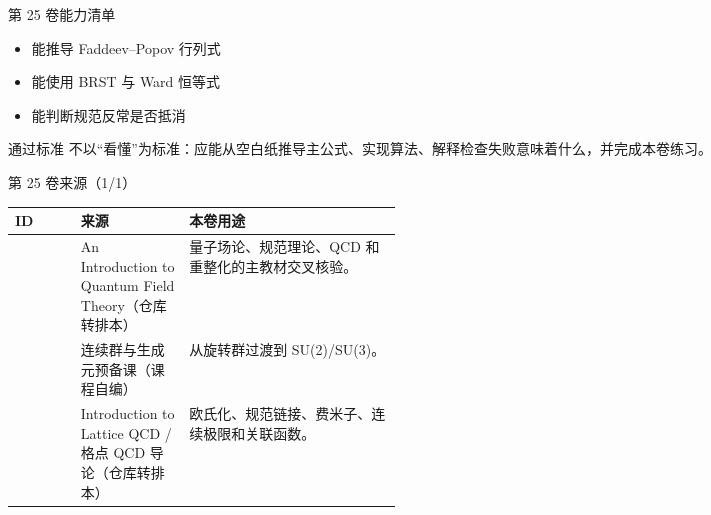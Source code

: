 \begin{frame}[t]{第 25 卷能力清单}
\small\begin{itemize}
\item[\CheckMark] 能推导 Faddeev--Popov 行列式
\item[\CheckMark] 能使用 BRST 与 Ward 恒等式
\item[\CheckMark] 能判断规范反常是否抵消
\end{itemize}\vfill\begin{block}{通过标准}
不以“看懂”为标准：应能从空白纸推导主公式、实现算法、解释检查失败意味着什么，并完成本卷练习。
\end{block}\end{frame}

\begin{frame}[t]{第 25 卷来源（1/1）}
\scriptsize\begin{tabularx}{\linewidth}{p{0.17\linewidth}p{0.28\linewidth}Y}
\toprule ID & 来源 & 本卷用途\\\midrule
{} & An Introduction to Quantum Field Theory（仓库转排本） & 量子场论、规范理论、QCD 和重整化的主教材交叉核验。\\
 & 连续群与生成元预备课（课程自编） & 从旋转群过渡到 SU(2)/\allowbreak{}SU(3)。\\
 & Introduction to Lattice QCD /\allowbreak{} 格点 QCD 导论（仓库转排本） & 欧氏化、规范链接、费米子、连续极限和关联函数。\\
\bottomrule\end{tabularx}\end{frame}

